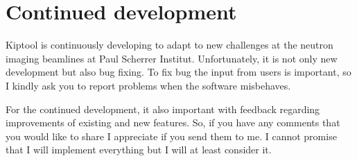 \documentclass[a4paper]{scrreprt}
\begin{document}
\chapter{Continued development}
Kiptool is continuously developing to adapt to new challenges at the neutron
imaging beamlines at Paul Scherrer Institut. Unfortunately, it is not only new
development but also bug fixing. To fix bug the input from users is important,
so I kindly ask you to report problems when the software misbehaves.

For the continued development, it also important with feedback regarding
improvements of existing and new features. So, if you have any comments that you
would like to share I appreciate if you send them to me. I cannot promise that I
will implement everything but I will at least consider it.



\end{document}
